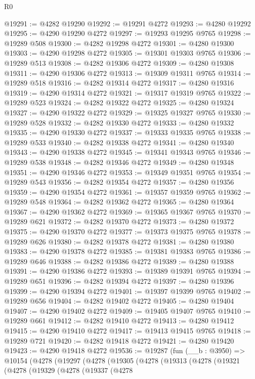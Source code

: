\begin{lexlean}{R0}
\begin{coremodule}
@19291 := @4282 @19290
@19292 := @19291 @4272
@19293 := @4280 @19292
@19295 := @4290 @19290 @4272
@19297 := @19293 @19295 @9765
@19298 := @19289 @508
@19300 := @4282 @19298 @4272
@19301 := @4280 @19300
@19303 := @4290 @19298 @4272
@19305 := @19301 @19303 @9765
@19306 := @19289 @513
@19308 := @4282 @19306 @4272
@19309 := @4280 @19308
@19311 := @4290 @19306 @4272
@19313 := @19309 @19311 @9765
@19314 := @19289 @518
@19316 := @4282 @19314 @4272
@19317 := @4280 @19316
@19319 := @4290 @19314 @4272
@19321 := @19317 @19319 @9765
@19322 := @19289 @523
@19324 := @4282 @19322 @4272
@19325 := @4280 @19324
@19327 := @4290 @19322 @4272
@19329 := @19325 @19327 @9765
@19330 := @19289 @528
@19332 := @4282 @19330 @4272
@19333 := @4280 @19332
@19335 := @4290 @19330 @4272
@19337 := @19333 @19335 @9765
@19338 := @19289 @533
@19340 := @4282 @19338 @4272
@19341 := @4280 @19340
@19343 := @4290 @19338 @4272
@19345 := @19341 @19343 @9765
@19346 := @19289 @538
@19348 := @4282 @19346 @4272
@19349 := @4280 @19348
@19351 := @4290 @19346 @4272
@19353 := @19349 @19351 @9765
@19354 := @19289 @543
@19356 := @4282 @19354 @4272
@19357 := @4280 @19356
@19359 := @4290 @19354 @4272
@19361 := @19357 @19359 @9765
@19362 := @19289 @548
@19364 := @4282 @19362 @4272
@19365 := @4280 @19364
@19367 := @4290 @19362 @4272
@19369 := @19365 @19367 @9765
@19370 := @19289 @621
@19372 := @4282 @19370 @4272
@19373 := @4280 @19372
@19375 := @4290 @19370 @4272
@19377 := @19373 @19375 @9765
@19378 := @19289 @626
@19380 := @4282 @19378 @4272
@19381 := @4280 @19380
@19383 := @4290 @19378 @4272
@19385 := @19381 @19383 @9765
@19386 := @19289 @646
@19388 := @4282 @19386 @4272
@19389 := @4280 @19388
@19391 := @4290 @19386 @4272
@19393 := @19389 @19391 @9765
@19394 := @19289 @651
@19396 := @4282 @19394 @4272
@19397 := @4280 @19396
@19399 := @4290 @19394 @4272
@19401 := @19397 @19399 @9765
@19402 := @19289 @656
@19404 := @4282 @19402 @4272
@19405 := @4280 @19404
@19407 := @4290 @19402 @4272
@19409 := @19405 @19407 @9765
@19410 := @19289 @661
@19412 := @4282 @19410 @4272
@19413 := @4280 @19412
@19415 := @4290 @19410 @4272
@19417 := @19413 @19415 @9765
@19418 := @19289 @721
@19420 := @4282 @19418 @4272
@19421 := @4280 @19420
@19423 := @4290 @19418 @4272
@19536 := @19287
    (fun (__b : @3950) =>
    @10154
      (@4278
        (@19297
          (@4278
            (@19305
              (@4278
                (@19313
                  (@4278
                    (@19321
                      (@4278
                        (@19329
                          (@4278
                            (@19337
                              (@4278

\end{coremodule}
\end{lexlean}
